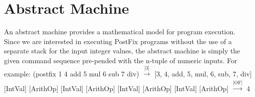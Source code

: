 \documentclass[a4paper,11pt]{article}
\begin{document}
\section{Abstract Machine}
\begin{par} An abstract machine provides a mathematical model for program execution. Since we are interested in executing PostFix programs without the use of a separate stack for the input integer values, the abstract machine is simply the given command sequence pre-pended with the n-tuple of numeric inputs. For example: \vspace{5mm} \newline
(postfix 1 4 add 5 mul 6 sub 7 div) $\xrightarrow[]{\text{[3]}}$ [3, 4, add, 5, mul, 6, sub, 7, div]  \hfill [IntVal]  \hfill [ArithOp]  \hfill [IntVal]  \hfill [ArithOp]  \hfill [IntVal] \newline
[29, 7, div] \hfill [ArithOp] \newline
[29, 7, div] \hfill [IntVal] \newline
[4] \hfill [ArithOp] \newline
[4] $\xrightarrow[]{\text{[OF]}}$ 4 \end{par}
\end{document}

